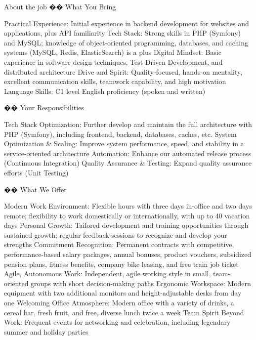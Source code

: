 About the job
�� What You Bring



Practical Experience: Initial experience in backend development for websites and applications, plus API familiarity
Tech Stack: Strong skills in PHP (Symfony) and MySQL; knowledge of object-oriented programming, databases, and caching systems (MySQL, Redis, ElasticSearch) is a plus
Digital Mindset: Basic experience in software design techniques, Test-Driven Development, and distributed architecture
Drive and Spirit: Quality-focused, hands-on mentality, excellent communication skills, teamwork capability, and high motivation
Language Skills: C1 level English proficiency (spoken and written)


�� Your Responsibilities



Tech Stack Optimization: Further develop and maintain the full architecture with PHP (Symfony), including frontend, backend, databases, caches, etc.
System Optimization & Scaling: Improve system performance, speed, and stability in a service-oriented architecture
Automation: Enhance our automated release process (Continuous Integration)
Quality Assurance & Testing: Expand quality assurance efforts (Unit Testing)


�� What We Offer



Modern Work Environment: Flexible hours with three days in-office and two days remote; flexibility to work domestically or internationally, with up to 40 vacation days
Personal Growth: Tailored development and training opportunities through sustained growth; regular feedback sessions to recognize and develop your strengths
Commitment Recognition: Permanent contracts with competitive, performance-based salary packages, annual bonuses, product vouchers, subsidized pension plans, fitness benefits, company bike leasing, and free train job ticket
Agile, Autonomous Work: Independent, agile working style in small, team-oriented groups with short decision-making paths
Ergonomic Workspace: Modern equipment with two additional monitors and height-adjustable desks from day one
Welcoming Office Atmosphere: Modern office with a variety of drinks, a cereal bar, fresh fruit, and free, diverse lunch twice a week
Team Spirit Beyond Work: Frequent events for networking and celebration, including legendary summer and holiday parties



